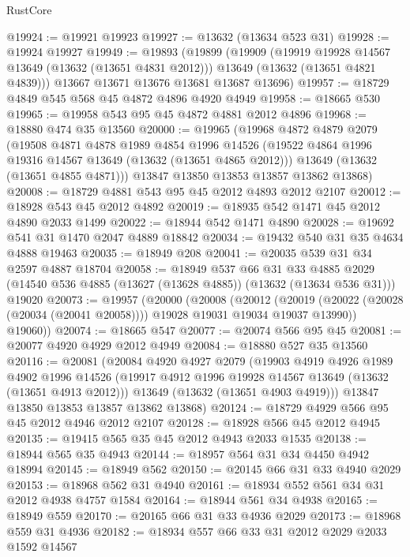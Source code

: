 \begin{lexlean}{RustCore}
\begin{coremodule}
@19924 := @19921 @19923
@19927 := @13632 (@13634 @523 @31)
@19928 := @19924 @19927
@19949 := @19893
    (@19899
      (@19909
        (@19919 @19928 @14567 @13649 (@13632 (@13651 @4831 @2012)))
        @13649
        (@13632 (@13651 @4821 @4839)))
      @13667
      @13671
      @13676
      @13681
      @13687
      @13696)
@19957 := @18729 @4849 @545 @568 @45 @4872 @4896 @4920 @4949
@19958 := @18665 @530
@19965 := @19958 @543 @95 @45 @4872 @4881 @2012 @4896
@19968 := @18880 @474 @35 @13560
@20000 := @19965
    (@19968
      @4872
      @4879
      @2079
      (@19508
        @4871
        @4878
        @1989
        @4854
        @1996
        @14526
        (@19522 @4864 @1996 @19316 @14567 @13649 (@13632 (@13651 @4865 @2012)))
        @13649
        (@13632 (@13651 @4855 @4871)))
      @13847
      @13850
      @13853
      @13857
      @13862
      @13868)
@20008 := @18729 @4881 @543 @95 @45 @2012 @4893 @2012 @2107
@20012 := @18928 @543 @45 @2012 @4892
@20019 := @18935 @542 @1471 @45 @2012 @4890 @2033 @1499
@20022 := @18944 @542 @1471 @4890
@20028 := @19692 @541 @31 @1470 @2047 @4889 @18842
@20034 := @19432 @540 @31 @35 @4634 @4888 @19463
@20035 := @18949 @208
@20041 := @20035 @539 @31 @34 @2597 @4887 @18704
@20058 := @18949
    @537
    @66
    @31
    @33
    @4885
    @2029
    (@14540 @536 @4885 (@13627 (@13628 @4885)) (@13632 (@13634 @536 @31)))
    @19020
@20073 := @19957
    (@20000
      (@20008
        (@20012
          (@20019 (@20022 (@20028 (@20034 (@20041 @20058)))) @19028 @19031 @19034 @19037 @13990))
        @19060))
@20074 := @18665 @547
@20077 := @20074 @566 @95 @45
@20081 := @20077 @4920 @4929 @2012 @4949
@20084 := @18880 @527 @35 @13560
@20116 := @20081
    (@20084
      @4920
      @4927
      @2079
      (@19903
        @4919
        @4926
        @1989
        @4902
        @1996
        @14526
        (@19917 @4912 @1996 @19928 @14567 @13649 (@13632 (@13651 @4913 @2012)))
        @13649
        (@13632 (@13651 @4903 @4919)))
      @13847
      @13850
      @13853
      @13857
      @13862
      @13868)
@20124 := @18729 @4929 @566 @95 @45 @2012 @4946 @2012 @2107
@20128 := @18928 @566 @45 @2012 @4945
@20135 := @19415 @565 @35 @45 @2012 @4943 @2033 @1535
@20138 := @18944 @565 @35 @4943
@20144 := @18957 @564 @31 @34 @4450 @4942 @18994
@20145 := @18949 @562
@20150 := @20145 @66 @31 @33 @4940 @2029
@20153 := @18968 @562 @31 @4940
@20161 := @18934 @552 @561 @34 @31 @2012 @4938 @4757 @1584
@20164 := @18944 @561 @34 @4938
@20165 := @18949 @559
@20170 := @20165 @66 @31 @33 @4936 @2029
@20173 := @18968 @559 @31 @4936
@20182 := @18934 @557 @66 @33 @31 @2012 @2029 @2033 @1592 @14567

\end{coremodule}
\end{lexlean}
